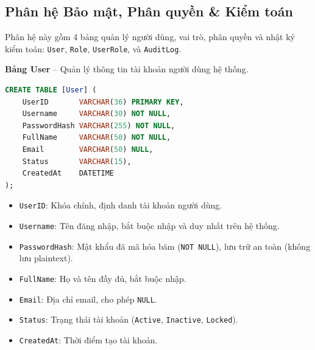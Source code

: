 \subsection{Phân hệ Bảo mật, Phân quyền \& Kiểm toán}

Phân hệ này gồm 4 bảng quản lý người dùng, vai trò, phân quyền và nhật ký kiểm toán: \texttt{User}, \texttt{Role}, \texttt{UserRole}, và \texttt{AuditLog}.

\vspace{0.5em}
\noindent\textbf{Bảng User} -- Quản lý thông tin tài khoản người dùng hệ thống.

\begin{tcolorbox}[colback=gray!5, colframe=gray!60, title={\textbf{CREATE TABLE [User]}}, fonttitle=\bfseries\small, boxrule=0.5pt, arc=2pt]
\begin{lstlisting}[language=SQL, basicstyle=\ttfamily\small, breaklines=true, showstringspaces=false, keywordstyle=\bfseries\color{blue!70!black}, stringstyle=\color{red!70!black}, commentstyle=\itshape\color{green!50!black}]
CREATE TABLE [User] (
    UserID       VARCHAR(36) PRIMARY KEY,
    Username     VARCHAR(30) NOT NULL,
    PasswordHash VARCHAR(255) NOT NULL,
    FullName     VARCHAR(50) NOT NULL,
    Email        VARCHAR(50) NULL,
    Status       VARCHAR(15),
    CreatedAt    DATETIME
);
\end{lstlisting}
\end{tcolorbox}

\begin{itemize}[leftmargin=2em]
    \item \texttt{UserID}: Khóa chính, định danh tài khoản người dùng.
    \item \texttt{Username}: Tên đăng nhập, bắt buộc nhập và duy nhất trên hệ thống.
    \item \texttt{PasswordHash}: Mật khẩu đã mã hóa băm (\texttt{NOT NULL}), lưu trữ an toàn (không lưu plaintext).
    \item \texttt{FullName}: Họ và tên đầy đủ, bắt buộc nhập.
    \item \texttt{Email}: Địa chỉ email, cho phép \texttt{NULL}.
    \item \texttt{Status}: Trạng thái tài khoản (\texttt{Active}, \texttt{Inactive}, \texttt{Locked}).
    \item \texttt{CreatedAt}: Thời điểm tạo tài khoản.
\end{itemize}

